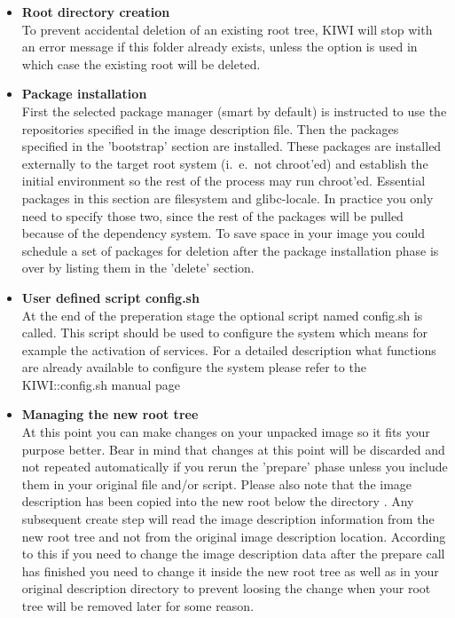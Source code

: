 \begin{itemize}
\item \textbf{Root directory creation}\\
      To prevent accidental deletion of an existing root tree, KIWI will
      stop with an error message if this folder already exists, unless the
      option  is used in which case the existing root will
      be deleted.
\item \textbf{Package installation}\\
      First the selected package manager (smart by default) is instructed to
      use the repositories specified in the image description file.
      Then the packages specified in the 'bootstrap' section are installed.
      These packages are installed externally to the target root system
      (i.~e.\ not chroot'ed) and establish the initial environment so the rest
      of  the process may run chroot'ed. Essential packages in this section
      are filesystem and glibc-locale. In practice you only need to
      specify those two, since the rest of the packages will be pulled
      because of the dependency system. To save space in your image you
      could schedule a set of packages for deletion after the package
      installation phase is over by listing them in the 'delete' section.
\item \textbf{User defined script config.sh}\\
      At the end of the preperation stage the optional script named config.sh
      is called. This script should be used to configure the system which means
      for example the activation of services. For a detailed description what
      functions are already available to configure the system please refer to
      the KIWI::config.sh manual page
\item \textbf{Managing the new root tree}\\
      At this point you can make changes on your unpacked image so it fits
      your purpose better. Bear in mind that changes at this point will be
      discarded and not repeated automatically if you rerun the 'prepare'
      phase unless you include them in your original  file and/or
       script. Please also note that the image description has
      been copied into the new root below the directory
      . Any subsequent create step will read
      the image description information from the new root tree and not
      from the original image description location. According to this
      if you need to change the image description data
      after the prepare call has finished you need to change it inside the
      new root tree as well as in your original description directory to
      prevent loosing the change when your root tree will be removed later
      for some reason.
\end{itemize}

